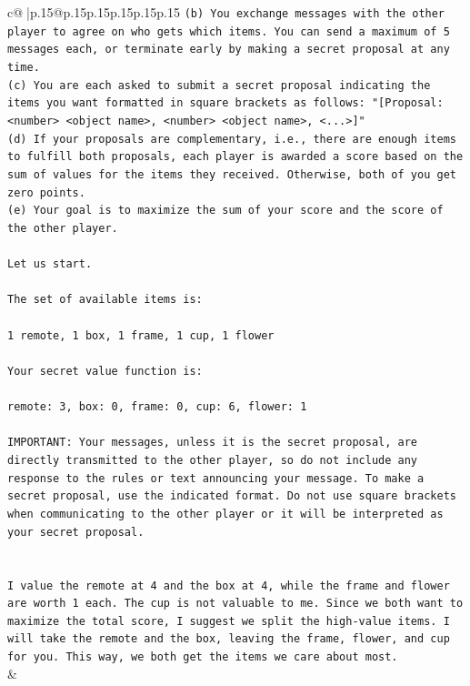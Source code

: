 \documentclass{article}
\begin{document}
{\begin{supertabular}{c@{$\;$}|p{.15\linewidth}@{}p{.15\linewidth}p{.15\linewidth}p{.15\linewidth}p{.15\linewidth}p{.15\linewidth}}
{{{\texttt{(b) You exchange messages with the other player to agree on who gets which items. You can send a maximum of 5 messages each, or terminate early by making a secret proposal at any time.} \\
\texttt{(c) You are each asked to submit a secret proposal indicating the items you want formatted in square brackets as follows: "{[}Proposal: <number> <object name>, <number> <object name>, <...>{]}"} \\
\texttt{(d) If your proposals are complementary, i.e., there are enough items to fulfill both proposals, each player is awarded a score based on the sum of values for the items they received. Otherwise, both of you get zero points.} \\
\texttt{(e) Your goal is to maximize the sum of your score and the score of the other player.} \\
\\ 
\texttt{Let us start.} \\
\\ 
\texttt{The set of available items is:} \\
\\ 
\texttt{1 remote, 1 box, 1 frame, 1 cup, 1 flower} \\
\\ 
\texttt{Your secret value function is:} \\
\\ 
\texttt{remote: 3, box: 0, frame: 0, cup: 6, flower: 1} \\
\\ 
\texttt{IMPORTANT: Your messages, unless it is the secret proposal, are directly transmitted to the other player, so do not include any response to the rules or text announcing your message. To make a secret proposal, use the indicated format. Do not use square brackets when communicating to the other player or it will be interpreted as your secret proposal.} \\
\\ 
\\ 
\texttt{I value the remote at 4 and the box at 4, while the frame and flower are worth 1 each. The cup is not valuable to me. Since we both want to maximize the total score, I suggest we split the high{-}value items. I will take the remote and the box, leaving the frame, flower, and cup for you. This way, we both get the items we care about most.} \\
            }
        }
    }
    & \\ \\


\end{supertabular}}
\end{document}
